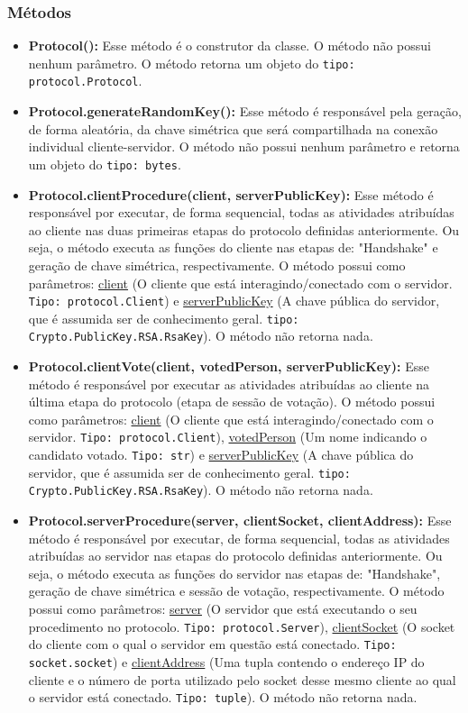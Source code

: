 \documentclass[10pt]{article}
\begin{document}
\begin{itemize}
        \subsubsection{\large Métodos}
            \begin{itemize}
             \item \textbf{Protocol():} Esse método é o construtor da classe. O método não possui nenhum parâmetro. O método retorna um objeto do \texttt{tipo: protocol.Protocol}.
             \item \textbf{Protocol.generateRandomKey():} Esse método é responsável pela geração, de forma aleatória, da chave simétrica que será compartilhada na conexão individual cliente-servidor. O método não possui nenhum parâmetro e retorna um objeto do \texttt{tipo: bytes}.
             \item \textbf{Protocol.clientProcedure(client, serverPublicKey):} Esse método é responsável por executar, de forma sequencial, todas as atividades atribuídas ao cliente nas duas primeiras etapas do protocolo definidas anteriormente. Ou seja, o método executa as funções do cliente nas etapas de: "Handshake" e geração de chave simétrica, respectivamente. O método possui como parâmetros: \underline{client} (O cliente que está interagindo/conectado com o servidor. \texttt{Tipo: protocol.Client}) e \underline{serverPublicKey} (A chave pública do servidor, que é assumida ser de conhecimento geral. \texttt{tipo: Crypto.PublicKey.RSA.RsaKey}). O método não retorna nada.
             \item \textbf{Protocol.clientVote(client, votedPerson, serverPublicKey):} Esse método é responsável por executar as atividades atribuídas ao cliente na última etapa do protocolo (etapa de sessão de votação). O método possui como parâmetros: \underline{client} (O cliente que está interagindo/conectado com o servidor. \texttt{Tipo: protocol.Client}), \underline{votedPerson} (Um nome indicando o candidato votado. \texttt{Tipo: str}) e \underline{serverPublicKey} (A chave pública do servidor, que é assumida ser de conhecimento geral. \texttt{tipo: Crypto.PublicKey.RSA.RsaKey}). O método não retorna nada.
             
             \item \textbf{Protocol.serverProcedure(server, clientSocket, clientAddress):} Esse método é responsável por executar, de forma sequencial, todas as atividades atribuídas ao servidor nas etapas do protocolo definidas anteriormente. Ou seja, o método executa as funções do servidor nas etapas de: "Handshake", geração de chave simétrica e sessão de votação, respectivamente. O método possui como parâmetros: \underline{server} (O servidor que está executando o seu procedimento no protocolo. \texttt{Tipo: protocol.Server}), \underline{clientSocket} (O socket do cliente com o qual o servidor em questão está conectado. \texttt{Tipo: socket.socket}) e \underline{clientAddress} (Uma tupla contendo o endereço IP do cliente e o número de porta utilizado pelo socket desse mesmo cliente ao qual o servidor está conectado. \texttt{Tipo: tuple}). O método não retorna nada.
             
            \end{itemize}
    \end{itemize}
\end{document}
